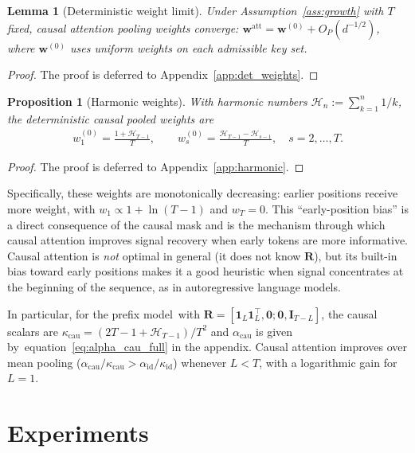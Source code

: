 \documentclass{article}
\def\eqref#1{equation~\ref{#1}}
\def\vzero{{\bm{0}}}
\def\vone{{\bm{1}}}
\def\vw{{\bm{w}}}
\def\mI{{\bm{I}}}
\def\mR{{\bm{R}}}
\newtheorem{lemma}{Lemma}
\newtheorem{proposition}{Proposition}
\newcommand{\cau}{\mathrm{cau}}
\newcommand{\id}{\mathrm{id}}
\begin{document}
\begin{lemma}[Deterministic weight limit]\label{lem:det_weights}
    Under Assumption~\ref{ass:growth} with $T$ fixed, causal attention pooling weights converge: $\vw^\mathrm{att} = \vw^{(0)} + O_P(d^{-1/2})$, where $\vw^{(0)}$ uses uniform weights on each admissible key set.
\end{lemma}
\begin{proof}
The proof is deferred to Appendix~\ref{app:det_weights}.
\end{proof}

\begin{proposition}[Harmonic weights]\label{prop:harmonic}
    With harmonic numbers $\mathcal{H}_n := \sum_{k=1}^n 1/k$, the deterministic causal pooled weights are
    \begin{align}\label{eq:w_cau}
        w_1^{(0)} = \frac{1 + \mathcal{H}_{T-1}}{T}, \qquad w_s^{(0)} = \frac{\mathcal{H}_{T-1} - \mathcal{H}_{s-1}}{T}, \quad s=2,\ldots,T.
    \end{align}
\end{proposition}
\begin{proof}
The proof is deferred to Appendix~\ref{app:harmonic}.
\end{proof}

Specifically, these weights are monotonically decreasing: earlier positions receive more weight, with $w_1 \propto 1 + \ln(T-1)$ and $w_T = 0$. This ``early-position bias'' is a direct consequence of the causal mask and is the mechanism through which causal attention improves signal recovery when early tokens are more informative. Causal attention is \emph{not} optimal in general (it does not know $\mR$), but its built-in bias toward early positions makes it a good heuristic when signal concentrates at the beginning of the sequence, as in autoregressive language models.

In particular, for the prefix model~with $\mR = [\vone_L\vone_L^\top, \vzero; \vzero, \mI_{T-L}]$, the causal scalars are $\kappa_\cau = (2T-1+\mathcal{H}_{T-1})/T^2$ and $\alpha_\cau$ is given by~\eqref{eq:alpha_cau_full} in the appendix. Causal attention improves over mean pooling ($\alpha_\cau/\kappa_\cau > \alpha_\id/\kappa_\id$) whenever $L < T$, with a logarithmic gain for $L=1$.


\section{Experiments}\label{sec:experiments}
\end{document}

